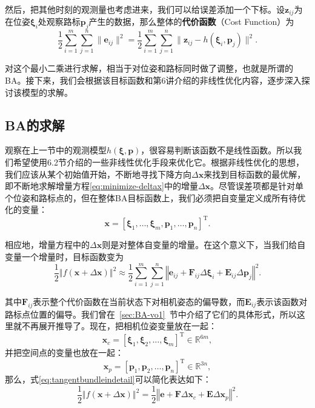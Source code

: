 然后，把其他时刻的观测量也考虑进来，我们可以给误差添加一个下标。设$\bm{z}_{ij}$为在位姿$\bm{\xi}_i$处观察路标$\bm{p}_j$产生的数据，那么整体的\textbf{代价函数}（Cost Function）为
\begin{equation}
\label{eq:BAcostfunction}
\frac{1}{2}\sum_{i=1}^m \sum_{j=1}^n \| \bm{e}_{ij} \|^2 = \frac{1}{2}\sum_{i=1}^m\sum_{j=1}^n \|
\bm{{z}}_{ij} - h(\bm{\xi}_{i},\bm{p}_j) \|^2 .
\end{equation}

对这个最小二乘进行求解，相当于对位姿和路标同时做了调整，也就是所谓的BA。接下来，我们会根据该目标函数和第6讲介绍的非线性优化内容，逐步深入探讨该模型的求解。

\subsection{BA的求解}
观察在上一节中的观测模型$h(\bm{\xi}, \bm{p})$，很容易判断该函数不是线性函数。所以我们希望使用6.2节介绍的一些非线性优化手段来优化它。根据非线性优化的思想，我们应该从某个初始值开始，不断地寻找下降方向$\Delta \bm{x}$来找到目标函数的最优解，即不断地求解增量方程\eqref{eq:minimize-deltax}中的增量$\Delta \bm{x}$。尽管误差项都是针对单个位姿和路标点的，但在整体BA目标函数上，我们必须把自变量定义成所有待优化的变量：
\begin{equation}
\bm{x} = [ \bm{\xi}_1, \ldots, \bm{\xi}_m, \bm{p}_1, \ldots, \bm{p}_n ]^\mathrm{T}.
\end{equation}

相应地，增量方程中的$\Delta \bm{x}$则是对整体自变量的增量。在这个意义下，当我们给自变量一个增量时，目标函数变为
\begin{equation}
\label{eq:tangentbundleindetail}
\frac{1}{2}\left\Vert f(\bm{x} + \Delta \bm{x}) \right\Vert ^2 \approx \frac{1}{2}\sum_{i=1}^{m}\sum_{j=1}^n \left\Vert \bm{e}_{ij} + \bm{F}_{ij} \Delta \bm{\xi}_{i} + \bm{E}_{ij} \Delta \bm{p}_j \right\Vert^2 .
\end{equation}

其中$\bm{F}_{ij}$表示整个代价函数在当前状态下对相机姿态的偏导数，而$\bm{E}_{ij}$表示该函数对路标点位置的偏导。我们曾在~\ref{sec:BA-vo1}~节中介绍了它们的具体形式，所以这里就不再展开推导了。现在，把相机位姿变量放在一起：
\begin{equation}
\bm{x}_c=[ \bm{\xi}_1, \bm{\xi}_2, \ldots, \bm{\xi}_m ]^\mathrm{T} \in \mathbb{R}^{6m},
\end{equation}
并把空间点的变量也放在一起：
\begin{equation}
\bm{x}_p=[ \bm{p}_1, \bm{p}_2, \ldots , \bm{p}_n ]^\mathrm{T}\in \mathbb{R}^{3n},
\end{equation}
那么，式\eqref{eq:tangentbundleindetail}可以简化表达如下：
\begin{equation}
\label{eq:BAleastsquare}
\frac{1}{2}
\left\Vert 
f(\bm{x}+ \Delta \bm{x} )
\right\Vert ^2 = 
\frac{1}{2} 
\left\Vert 
\bm{e} + \bm{F}\Delta \bm{x}_c + \bm{E} \Delta \bm{x}_p 
\right \Vert ^2 .
\end{equation}

